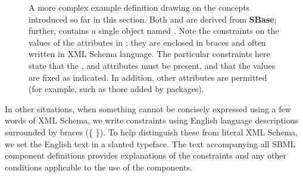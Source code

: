 \begin{figure}[bh]
  \vspace*{1ex}
  \centering
  \small
  \vspace*{1ex}
  \caption{A more complex example definition drawing on the
    concepts introduced so far in this section.  Both 
    and  are derived from \textup{\textbf{\textsf{SBase}}};
    further,  contains a single  object
    named .  Note the constraints on the values of
    the attributes in ; they are enclosed in braces
    and often written in XML Schema language.  The particular
    constraints here state that the , 
    and  attributes must be present, and that the
    values are fixed as indicated.  In addition, other attributes
    are permitted (for example, such as those added by \thisL
    packages).}
  \label{fig:unit-eg}
\end{figure}

In other situations, when something cannot be concisely expressed
using a few words of XML Schema, we write constraints using
English language descriptions surrounded by braces (\{ \}).  To
help distinguish these from literal XML Schema, we set the English
text in a slanted typeface.  The text accompanying all SBML
component definitions provides explanations of the constraints and
any other conditions applicable to the use of the components.

